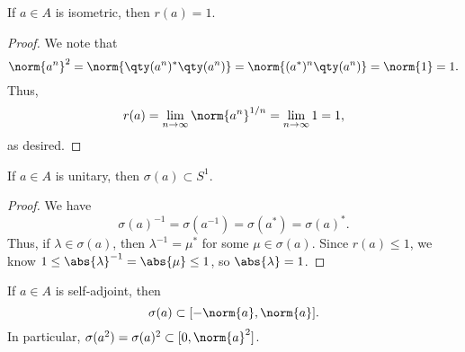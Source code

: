 \begin{corollary}
If $a \in A$ is isometric, then $r(a) = 1$.
\end{corollary}

\begin{proof}
We note that
\begin{equation}
\norm{a^n}^2 = \norm{\qty(a^n)^* \qty(a^n)} = \norm{(a^*)^n \qty(a^n)} = \norm{1} = 1.
\end{equation}
Thus,
\begin{equation}
r(a) = \lim_{n \rightarrow \infty} \norm{a^n}^{1/n} = \lim_{n \rightarrow \infty} 1 = 1,
\end{equation}
as desired.
\end{proof}

\begin{corollary}
If $a \in A$ is unitary, then $\sigma(a) \subset S^1$.
\end{corollary}

\begin{proof}
We have 
\begin{equation}
\sigma(a)^{-1} = \sigma(a^{-1}) = \sigma(a^*) = \sigma(a)^*.
\end{equation}
Thus, if $\lambda \in \sigma(a)$, then $\lambda^{-1} = \mu^*$ for some $\mu \in \sigma(a)$. Since $r(a) \leq 1$, we know $1 \leq \abs{\lambda}^{-1} = \abs{\mu} \leq 1$, so $\abs{\lambda} = 1$.
\end{proof}


\begin{theorem}
If $a \in A$ is self-adjoint, then
\begin{equation}
\sigma(a) \subset [-\norm{a}, \norm{a}].
\end{equation}
In particular, $\sigma(a^2) = \sigma(a)^2 \subset [0, \norm{a}^2]$.
\end{theorem}

